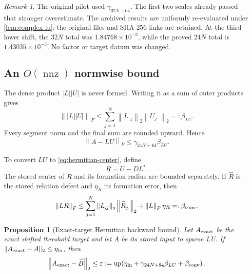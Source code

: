 \documentclass[11pt]{article}
\newtheorem{proposition}[theorem]{Proposition}
\theoremstyle{definition}
\theoremstyle{remark}
\newtheorem{remark}[theorem]{Remark}
\newcommand{\norm}[1]{\left\lVert#1\right\rVert}
\newcommand{\Bhat}{\widehat B}
\newcommand{\up}{\operatorname{up}}
\begin{document}
\begin{remark}
The original pilot used $\gamma_{32N+64}$.  The first two scales already
passed that stronger overestimate.  The archived results are uniformly
re-evaluated under \cref{lem:complex-lu}; the original files and SHA-256
links are retained.  At the third lower shift, the $32N$ total was
$1.84768\times10^{-3}$, while the proved $24N$ total is
$1.43035\times10^{-3}$.  No factor or target datum was changed.
\end{remark}

\subsection{An \texorpdfstring{$O(\operatorname{nnz})$}{O(nnz)} normwise bound}

The dense product $|L||U|$ is never formed.  Writing it as a sum of outer
products gives
\begin{equation}
 \norm{|L||U|}_F
 \leq
 \sum_{j=1}^N\norm{L_{:j}}_2\norm{U_{j:}}_2
 =:\beta_{LU}.
 \label{eq:outer-lu}
\end{equation}
Every segment norm and the final sum are rounded upward.  Hence
\begin{equation}
 \norm{A-LU}_F
 \leq \gamma_{24N+64}\beta_{LU}.
 \label{eq:lu-frobenius}
\end{equation}

To convert $LU$ to \cref{eq:hermitian-center}, define
\begin{equation}
 R=U-DL^*.
 \label{eq:relation-defect}
\end{equation}
The stored center of $R$ and its formation radius are bounded separately.
If $\widehat R$ is the stored relation defect and $\eta_R$ its formation
error, then
\begin{equation}
 \norm{L R}_F
 \leq
 \sum_{j=1}^N\norm{L_{:j}}_2\norm{\widehat R_{j:}}_2
 +\norm{L}_F\eta_R
 =:\beta_{\rm conv}.
 \label{eq:conversion-bound}
\end{equation}

\begin{proposition}[Exact-target Hermitian backward bound]
\label{prop:hermitian-bound}
Let $A_{\rm exact}$ be the exact shifted threshold target and let $A$ be its
stored input to sparse LU.  If
$\|A_{\rm exact}-A\|_2\leq\eta_{\rm in}$, then
\begin{equation}
 \norm{A_{\rm exact}-\Bhat}_2
 \leq
 \varepsilon
 :=
 \up\!\left(
 \eta_{\rm in}
 +\gamma_{24N+64}\beta_{LU}
 +\beta_{\rm conv}
 \right).
 \label{eq:total-backward}
\end{equation}
\end{proposition}
\end{document}
